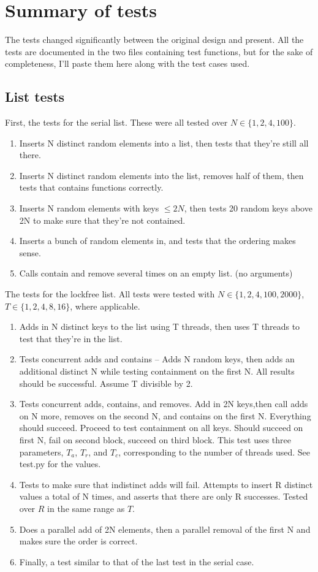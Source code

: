 \documentclass{article}
\begin{document}
\section*{Summary of tests}
The tests changed significantly between the original design and present. All the tests are documented in the two files containing test functions, but for the sake of completeness, I'll paste them here along with the test cases used.
\subsection*{List tests}
First, the tests for the serial list. These were all tested over $N\in \{1,2,4,100\}$.

\begin{enumerate}
    \item Inserts N distinct random elements into a list, then tests that they're still all there. 
    \item Inserts N distinct random elements into the list, removes half of them, then tests that contains functions correctly.
    \item Inserts N random elements with keys $\leq2N$, then tests 20 random keys above 2N to make sure that they're not contained.
    \item Inserts a bunch of random elements in, and tests that the ordering makes sense.
    \item Calls contain and remove several times on an empty list. (no arguments)
\end{enumerate}

The tests for the lockfree list. All tests were tested with $N\in\{1,2,4,100,2000\}$, $T\in\{1,2,4,8,16\}$, where applicable.

\begin{enumerate}
    \item Adds in N distinct keys to the list using T threads, then uses T threads to test that they're in the list.
    \item Tests concurrent adds and contains -- Adds N random keys, then adds an additional distinct N while testing containment on the first N. All results should be successful. Assume T divisible by 2.
    \item Tests concurrent adds, contains, and removes. Add in 2N keys,then call adds on N more, removes on the second N, and contains on the first N. Everything should succeed. Proceed to test containment on all keys. Should succeed on first N, fail on second block, succeed on third block. This test uses three parameters, $T_a$, $T_r$, and $T_c$, corresponding to the number of threads used. See test.py for the values.
    \item Tests to make sure that indistinct adds will fail. Attempts to insert R distinct values a total of N times, and asserts that there are only R successes. Tested over $R$ in the same range as $T$.
    \item Does a parallel add of 2N elements, then a parallel removal of the first N and makes sure the order is correct.
    \item Finally, a test similar to that of the last test in the serial case.
\end{enumerate}
\end{document}
